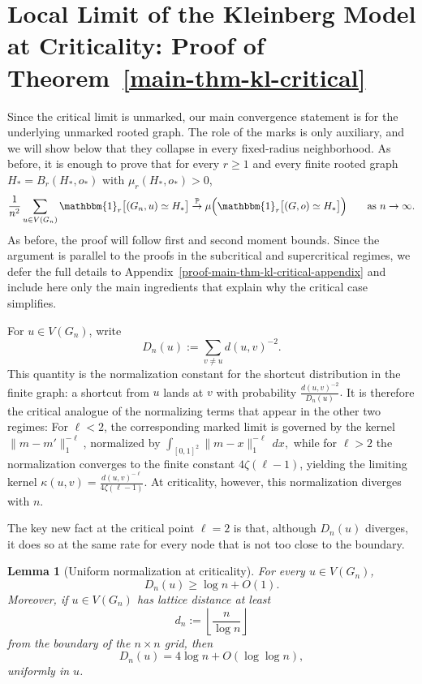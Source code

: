 \documentclass[10pt]{amsart}
\newtheorem{lemma}[theorem]{Lemma}
\begin{document}
\section{Local Limit of the Kleinberg Model at Criticality: Proof of Theorem~\ref{main-thm-kl-critical}} \label{proof-main-thm-kl-critical}

Since the critical limit is unmarked, our main convergence statement is for the underlying unmarked rooted graph. The role of the marks is only auxiliary, and we will show below that they collapse in every fixed-radius neighborhood. As before, it is enough to prove that for every \(r\ge 1\) and every finite rooted graph \(H_* = B_r(H_*,o_*)\) with \(\mu_r(H_*,o_*)>0\),
\begin{equation*}
\frac{1}{n^2}\sum_{u\in V(G_n)} \mathbbm{1}_r\big[(G_n,u)\simeq H_*\big]
\overset{\mathbb P}{\to}
\mu\Big(\mathbbm{1}_r\big[(G,o)\simeq H_*\big]\Big)
\qquad \text{as } n\to\infty.
\end{equation*}
As before, the proof will follow first and second moment bounds. Since the argument is parallel to the proofs in the subcritical and supercritical regimes, we defer the full details to Appendix~\ref{proof-main-thm-kl-critical-appendix} and include here only the main ingredients that explain why the critical case simplifies.

For \(u\in V(G_n)\), write
\[
D_n(u):=\sum_{v\neq u} d(u,v)^{-2}.
\]
This quantity is the normalization constant for the shortcut distribution in the finite graph: a shortcut from \(u\) lands at \(v\) with probability
\(
\frac{d(u,v)^{-2}}{D_n(u)}.
\)
It is therefore the critical analogue of the normalizing terms that appear in the other two regimes: For \(\ell<2\), the corresponding marked limit is governed by the kernel \(\|m-m'\|_1^{-\ell}\), normalized by
\(
\int_{[0,1]^2}\|m-x\|_1^{-\ell}\,dx,
\)
while for \(\ell>2\) the normalization converges to the finite constant \(4\zeta(\ell-1)\), yielding the limiting kernel
\(
\kappa(u,v)=\frac{d(u,v)^{-\ell}}{4\zeta(\ell-1)}.
\)
At criticality, however, this normalization diverges with \(n\).

The key new fact at the critical point \(\ell=2\) is that, although \(D_n(u)\) diverges, it does so at the same rate for every node that is not too close to the boundary.

\begin{lemma}[Uniform normalization at criticality]\label{lem:uniform-normalization}
For every \(u\in V(G_n)\),
\[
D_n(u)\ge \log n+O(1).
\]
Moreover, if \(u\in V(G_n)\) has lattice distance at least
\[
d_n:=\left\lfloor \frac{n}{\log n}\right\rfloor
\]
from the boundary of the \(n\times n\) grid, then
\[
D_n(u)=4\log n+O(\log\log n),
\]
uniformly in \(u\).
\end{lemma}
\end{document}
